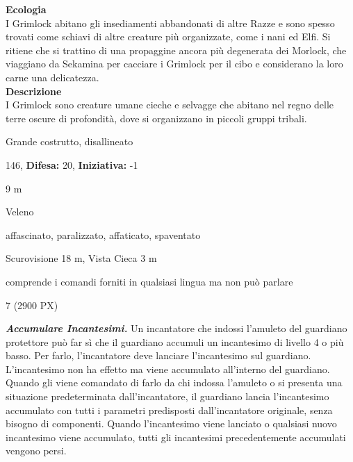 \begin{multicols}{2}
{\textbf{Ecologia}\\
I Grimlock abitano gli insediamenti abbandonati di altre Razze e sono spesso trovati come schiavi di altre creature più organizzate, come i nani ed Elfi. Si ritiene che si trattino di una propaggine ancora più degenerata dei Morlock, che viaggiano da Sekamina per cacciare i Grimlock per il cibo e considerano la loro carne una delicatezza.\\
\textbf{Descrizione}\\
I Grimlock sono creature umane cieche e selvagge che abitano nel regno delle terre oscure di profondità, dove si organizzano in piccoli gruppi tribali.

\noindent
\begin{description}[noitemsep, topsep=0pt, parsep=0pt, partopsep=0pt, leftmargin=0cm, labelwidth=2.2cm]
	\item[\textbf{Taglia/Tipo:}] Grande costrutto, disallineato
	\item[\textbf{Caratt.:}] 
	\item[\textbf{Punti Ferita:}] 146,  \textbf{Difesa:} 20,  \textbf{Iniziativa:} -1
	\item[\textbf{Movimento:}] 9 m
	\item[\textbf{Tiri Salvez.:}] 
	\item[\textbf{Imm. Danni:}] Veleno
	\item[\textbf{Immunità:}] affascinato, paralizzato, affaticato, spaventato
	\item[\textbf{Sensi:}] Scurovisione 18 m, Vista Cieca 3 m
	\item[\textbf{Linguaggi:}] comprende i comandi forniti in qualsiasi lingua ma non può parlare
	\item[\textbf{Sfida:}] 7 (2900 PX)\smallskip
\end{description}

\emph{\textbf{Accumulare Incantesimi.}} Un incantatore che indossi l'amuleto del guardiano protettore può far sì che il guardiano accumuli un incantesimo di livello 4 o più basso. Per farlo, l'incantatore deve lanciare l'incantesimo sul guardiano. L'incantesimo non ha effetto ma viene accumulato all'interno del guardiano. Quando gli viene comandato di farlo da chi indossa l'amuleto o si presenta una situazione predeterminata dall'incantatore, il guardiano lancia l'incantesimo accumulato con tutti i parametri predisposti dall'incantatore originale, senza bisogno di componenti. Quando l'incantesimo viene lanciato o qualsiasi nuovo incantesimo viene accumulato, tutti gli incantesimi precedentemente accumulati vengono persi.

}
\end{multicols}
